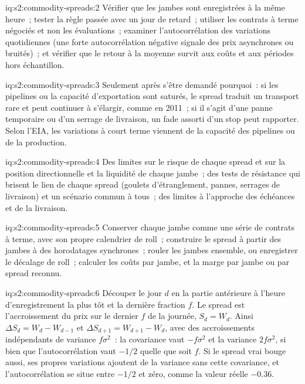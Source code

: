 \begin{solution}{iq:s2:commodity-spreads:2}
Vérifier que les jambes sont enregistrées à la même heure~; tester la règle passée avec un jour de retard~; utiliser les contrats à terme négociés et non les évaluations~; examiner
l'autocorrélation des variations quotidiennes (une forte autocorrélation négative signale des prix asynchrones ou bruités)~; et vérifier que le retour à la moyenne survit aux coûts
et aux périodes hors échantillon.
\end{solution}

\begin{solution}{iq:s2:commodity-spreads:3}
Seulement après s'être demandé pourquoi~: si les pipelines ou la capacité d'exportation sont saturés, le spread traduit un transport rare et peut continuer à s'élargir, comme en 2011~; si
il s'agit d'une panne temporaire ou d'un serrage de livraison, un fade assorti d'un stop peut rapporter. Selon l'EIA, les variations à court terme viennent de la capacité des pipelines ou
de la production.
\end{solution}

\begin{solution}{iq:s2:commodity-spreads:4}
Des limites sur le risque de chaque spread et sur la position directionnelle et la liquidité de chaque jambe~; des tests de résistance qui brisent le lien de chaque spread (goulets d'étranglement, pannes,
serrages de livraison) et un scénario commun à tous~; des limites à l'approche des échéances et de la livraison.
\end{solution}

\begin{solution}{iq:s2:commodity-spreads:5}
Conserver chaque jambe comme une série de contrats à terme, avec son propre calendrier de roll~; construire le spread à partir des jambes à des horodatages synchrones~; rouler les jambes
ensemble, ou enregistrer le décalage de roll~; calculer les coûts par jambe, et la marge par jambe ou par spread reconnu.
\end{solution}

\begin{solution}{iq:s2:commodity-spreads:6}
Découper le jour $d$ en la partie antérieure à l'heure d'enregistrement la plus tôt et la dernière fraction $f$. Le spread est l'accroissement du prix sur le dernier $f$ de la
journée, $S_d = W_d$. Ainsi $\Delta S_d = W_d - W_{d-1}$ et $\Delta S_{d+1} = W_{d+1} - W_d$, avec des accroissements indépendants de variance $f\sigma^2$~: la
covariance vaut $-f\sigma^2$ et la variance $2f\sigma^2$, si bien que l'autocorrélation vaut $-1/2$ quelle que soit $f$. Si le spread vrai bouge aussi, ses propres variations
ajoutent de la variance sans cette covariance, et l'autocorrélation se situe entre $-1/2$ et zéro, comme la valeur réelle $-0.36$.
\end{solution}
